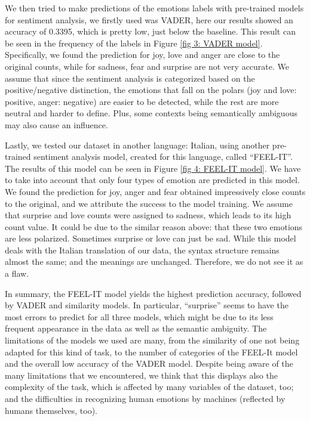We then tried to make predictions of the emotions labels with pre-trained models for sentiment analysis, we firstly used was VADER, here our results showed an accuracy of 0.3395, which is pretty low, just below the baseline. This result can be seen in the frequency of the labels in {Figure \ref{fig 3: VADER model}}.
Specifically, we found the prediction for joy, love and anger are close to the original counts, while for sadness, fear and surprise are not very accurate. We assume that since the sentiment analysis is categorized based on the positive/negative distinction, the emotions that fall on the polars (joy and love: positive, anger: negative) are easier to be detected, while the rest are more neutral and harder to define. Plus, some contexts being semantically ambiguous may also cause an influence.

Lastly, we tested our dataset in another language: Italian, using another pre-trained sentiment analysis model, created for this language, called “FEEL-IT”. The results of this model can be seen in {Figure \ref{fig 4: FEEL-IT model}}. We have to take into account that only four types of emotion are predicted in this model. We found the prediction for joy, anger and fear obtained impressively close counts to the original, and we attribute the success to the model training. We assume that surprise and love counts were assigned to sadness, which leads to its high count value. It could be due to the similar reason above: that these two emotions are less polarized. Sometimes surprise or love can just be sad. 
While this model deals with the Italian translation of our data, the syntax structure remains almost the same; and the meanings are unchanged. Therefore, we do not see it as a flaw.

In summary, the FEEL-IT model yields the highest prediction accuracy, followed by VADER and similarity models. In particular, “surprise” seems to have the most errors to predict for all three models, which might be due to its less frequent appearance in the data as well as the semantic ambiguity. 
The limitations of the models we used are many, from the similarity of one not being adapted for this kind of task, to the number of categories of the FEEL-It model and the overall low accuracy of the VADER model.
Despite being aware of the many limitations that we encountered, we think that this displays also the complexity of the task, which is affected by many variables of the dataset, too;  and the difficulties in recognizing human emotions by machines (reflected by humans themselves, too). 

